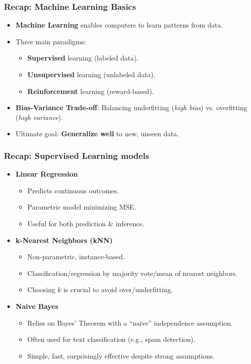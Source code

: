 \documentclass[aspectratio=169]{beamer}
\begin{document}
\begin{frame}
    \frametitle{Recap: Machine Learning Basics}
    \begin{itemize}
        \item \textbf{Machine Learning} enables computers to learn patterns from data.
        \item Three main paradigms:
            \begin{itemize}
                \item \textbf{Supervised} learning (labeled data).
                \item \textbf{Unsupervised} learning (unlabeled data).
                \item \textbf{Reinforcement} learning (reward-based).
            \end{itemize}
        \item \textbf{Bias-Variance Trade-off}: Balancing underfitting (\textit{high bias}) vs. overfitting (\textit{high variance}).
        \item Ultimate goal: \textbf{Generalize well} to new, unseen data.
    \end{itemize}
\end{frame}

\begin{frame}
    \frametitle{Recap: Supervised Learning models}
    \begin{itemize}
        \item \textbf{Linear Regression}
            \begin{itemize}
                \item Predicts continuous outcomes.
                \item Parametric model minimizing MSE.
                \item Useful for both prediction \& inference.
            \end{itemize}
        \item \textbf{k-Nearest Neighbors (kNN)}
            \begin{itemize}
                \item Non-parametric, instance-based.
                \item Classification/regression by majority vote/mean of nearest neighbors.
                \item Choosing $k$ is crucial to avoid over/underfitting.
            \end{itemize}
        \item \textbf{Naive Bayes}
            \begin{itemize}
                \item Relies on Bayes' Theorem with a ``naive'' independence assumption.
                \item Often used for text classification (e.g., spam detection).
                \item Simple, fast, surprisingly effective despite strong assumptions.
            \end{itemize}
    \end{itemize}
\end{frame}
\end{document}
